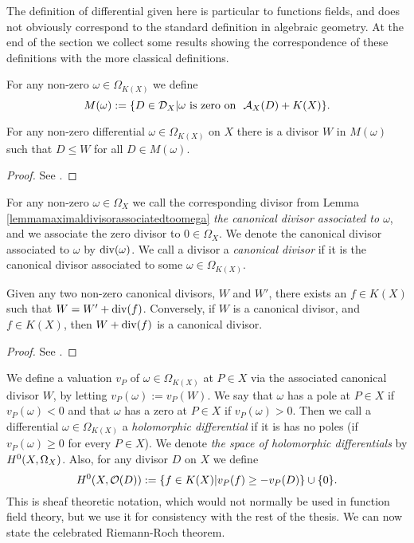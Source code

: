     \begin{rem}
    The definition of differential given here is particular to functions fields, and does not obviously correspond to the standard definition in algebraic geometry.
    At the end of the section we collect some results showing the correspondence of these definitions with the more classical definitions.
    \end{rem}

For any non-zero $\omega \in \Omega_{K(X)}$ we define
    \[
    M(\omega) := \{ D\in {\mathcal D}_X | \omega \ \text{is zero on }\ {\mathcal A}_X(D) + K(X)\}.
    \]

    \begin{lem}\label{lemmamaximaldivisorassociatedtoomega}
    For any non-zero differential $\omega \in \Omega_{K(X)}$ on $X$ there is a divisor $W$ in $M(\omega)$ such that $D \leq W$ for all $D \in M( \omega)$.
    \end{lem}
    \begin{proof}
    See \cite[Lem. 1.5.10]{stichtenoth}.
    \end{proof}

For any non-zero $\omega \in \Omega_X$ we call the corresponding divisor from Lemma \ref{lemmamaximaldivisorassociatedtoomega} {\em the canonical divisor associated to $\omega$}, and we associate the zero divisor to $0 \in \Omega_X$.
We denote the canonical divisor associated to $\omega$ by $\operatorname{div}(\omega)$.
We call a divisor a {\em canonical divisor} if it is the canonical divisor associated to some $\omega \in \Omega_{K(X)}$.
    
    \begin{lem}
    Given any two non-zero canonical divisors, $W$ and $W'$, there exists an $f\in K(X)$ such that $W = W' + \operatorname{div}(f)$.
    Conversely, if $W$ is a canonical divisor, and $f\in K(X)$, then $W + \operatorname{div}(f)$ is a canonical divisor.
    \end{lem}
    \begin{proof}
    See \cite[Prop. 1.5.13]{stichtenoth}.
    \end{proof}

We define a valuation $v_P$ of $\omega \in \Omega_{K(X)}$ at $P \in X$ via the associated canonical divisor $W$, by letting $v_P(\omega) := v_P(W)$.
We say that $\omega$ has a pole at $P \in X$ if $v_P(\omega) < 0$ and that $\omega$ has a zero at $P \in X$ if $v_P(\omega) >0$.
Then we call a differential $\omega \in \Omega_{K(X)}$ a {\em holomorphic differential} if it is has no poles (\ie if $v_P(\omega) \geq 0 $ for every $P \in X$).
We denote {\em the space of holomorphic differentials} by ${H^0(X,\Omega_X)}$.
Also, for any divisor $D$ on $X$ we define 
    \[
    H^0(X,{\cal O}(D)) := \{f\in K(X) | v_P(f) \geq -v_P(D)\}\cup \{0\}.
    \]
This is sheaf theoretic notation, which would not normally be used in function field theory, but we use it for consistency with the rest of the thesis.
We can now state the celebrated Riemann-Roch theorem.

